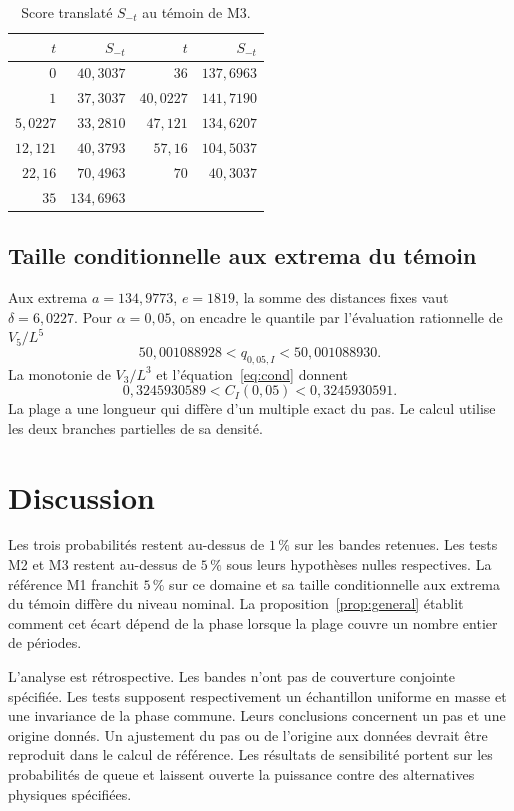 \documentclass[11pt,a4paper]{article}
\begin{document}
\begin{table}[htbp]
\centering
\caption{Score translaté $S_{-t}$ au témoin de M3.}
\label{tab:phase}
\begin{tabular}{rr@{\qquad}rr}
\toprule
$t$ & $S_{-t}$ & $t$ & $S_{-t}$\\
\midrule
$0$        & $40{,}3037$  & $36$      & $137{,}6963$\\
$1$        & $37{,}3037$  & $40{,}0227$ & $141{,}7190$\\
$5{,}0227$ & $33{,}2810$  & $47{,}121$ & $134{,}6207$\\
$12{,}121$ & $40{,}3793$  & $57{,}16$  & $104{,}5037$\\
$22{,}16$  & $70{,}4963$  & $70$       & $40{,}3037$\\
$35$       & $134{,}6963$ &             & \\
\bottomrule
\end{tabular}
\end{table}

\subsection{Taille conditionnelle aux extrema du témoin}

Aux extrema $a=134{,}9773$, $e=1819$, la somme des distances fixes vaut $\delta=6{,}0227$. Pour $\alpha=0{,}05$, on encadre le quantile par l'évaluation rationnelle de $V_5/L^5$
\[
50{,}001088928<q_{0{,}05,I}<50{,}001088930.
\]
La monotonie de $V_3/L^3$ et l'équation~\eqref{eq:cond} donnent
\[
0{,}3245930589<C_I(0{,}05)<0{,}3245930591.
\]
La plage a une longueur qui diffère d'un multiple exact du pas. Le calcul utilise les deux branches partielles de sa densité.

\section{Discussion}

Les trois probabilités restent au-dessus de $1\,\%$ sur les bandes retenues. Les tests M2 et M3 restent au-dessus de $5\,\%$ sous leurs hypothèses nulles respectives. La référence M1 franchit $5\,\%$ sur ce domaine et sa taille conditionnelle aux extrema du témoin diffère du niveau nominal. La proposition~\ref{prop:general} établit comment cet écart dépend de la phase lorsque la plage couvre un nombre entier de périodes.

L'analyse est rétrospective. Les bandes n'ont pas de couverture conjointe spécifiée. Les tests supposent respectivement un échantillon uniforme en masse et une invariance de la phase commune. Leurs conclusions concernent un pas et une origine donnés. Un ajustement du pas ou de l'origine aux données devrait être reproduit dans le calcul de référence. Les résultats de sensibilité portent sur les probabilités de queue et laissent ouverte la puissance contre des alternatives physiques spécifiées.
\end{document}
